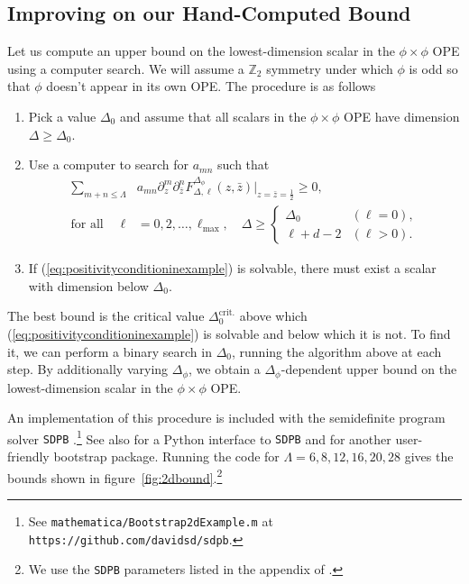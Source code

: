 \documentclass[11pt]{ws-rv9x6}
\newcommand\f\phi
\newcommand\ptl\partial
\newcommand\<\langle
\renewcommand\>\rangle
\newcommand\Z{\mathbb{Z}}
\newcommand\nn{\nonumber}
\renewcommand\.{\cdot}
\newcommand\x\times
\newcommand\De{\Delta}
\begin{document}
\subsection{Improving on our Hand-Computed Bound}

Let us compute an upper bound on the lowest-dimension scalar in the $\f\x\f$ OPE using a computer search. We will assume a $\Z_2$ symmetry under which $\f$ is odd so that $\f$ doesn't appear in its own OPE\@. The procedure is as follows
\begin{enumerate}
\item Pick a value $\De_0$ and assume that all scalars in the $\f\x\f$ OPE have dimension $\De\geq \De_0$.

\item Use a computer to search for $a_{mn}$ such that
\begin{align}
\label{eq:positivityconditioninexample}
\sum_{m+n\leq \Lambda} & a_{mn}  \ptl_z^m\ptl_{\bar z}^n F^{\De_\f}_{\De,\ell}(z,\bar z)|_{z=\bar z = \frac 1 2} \geq 0,\nn\\
\textrm{for all }\quad\ell &= 0,2,\dots,\ell_\mathrm{max},\quad\De \geq \begin{cases}
\De_0 & (\ell=0), \\
\ell+d-2 & (\ell>0).
\end{cases}
\end{align}

\item If (\ref{eq:positivityconditioninexample}) is solvable, there must exist a scalar with dimension below $\De_0$.

\end{enumerate}

The best bound is the critical value $\De_{0}^\mathrm{crit.}$ above which (\ref{eq:positivityconditioninexample}) is solvable and below which it is not. To find it, we can perform a binary search in $\De_0$, running the algorithm above at each step. By additionally varying $\De_\f$, we obtain a $\De_\f$-dependent upper bound on the lowest-dimension scalar in the $\f\x\f$ OPE.

An implementation of this procedure is included with the semidefinite program solver {\tt SDPB} \cite{Simmons-Duffin:2015qma}.\footnote{See {\tt mathematica/Bootstrap2dExample.m} at {\tt https://github.com/davidsd/sdpb}.}  See also \cite{Behan:2016dtz} for a Python interface to {\tt SDPB} and \cite{Paulos:2014vya} for another user-friendly bootstrap package.  Running the code for $\Lambda=6,8,12,16,20,28$ gives the bounds shown in figure~\ref{fig:2dbound}.\footnote{We use the {\tt SDPB} parameters listed in the appendix of \cite{Simmons-Duffin:2015qma}.}  
\end{document}
